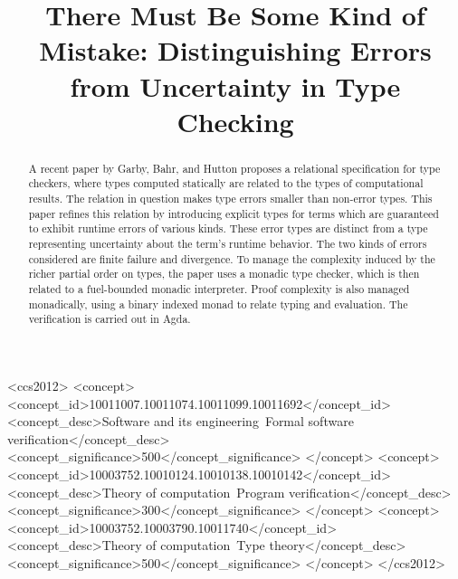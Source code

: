 \documentclass[acmsmall,screen,review]{acmart}
\begin{document}
\title{There Must Be Some Kind of Mistake: Distinguishing Errors from Uncertainty in Type Checking}




\renewcommand{\shortauthors}{\ }%

\begin{abstract}
  A recent paper by Garby, Bahr, and Hutton proposes a relational
  specification for type checkers, where types computed statically are
  related to the types of computational results.  The relation in
  question makes type errors smaller than non-error types.  This paper
  refines this relation by introducing explicit types for terms which
  are guaranteed to exhibit runtime errors of various kinds.  These
  error types are distinct from a type representing uncertainty about
  the term's runtime behavior.  The two kinds of errors considered are
  finite failure and divergence.  To manage the complexity induced by
  the richer partial order on types, the paper uses a monadic type
  checker, which is then related to a fuel-bounded monadic
  interpreter.  Proof complexity is also managed monadically, using a
  binary indexed monad to relate typing and evaluation.  The
  verification is carried out in Agda.
\end{abstract}

\begin{CCSXML}
<ccs2012>
   <concept>
       <concept_id>10011007.10011074.10011099.10011692</concept_id>
       <concept_desc>Software and its engineering~Formal software verification</concept_desc>
       <concept_significance>500</concept_significance>
       </concept>
   <concept>
       <concept_id>10003752.10010124.10010138.10010142</concept_id>
       <concept_desc>Theory of computation~Program verification</concept_desc>
       <concept_significance>300</concept_significance>
       </concept>
   <concept>
       <concept_id>10003752.10003790.10011740</concept_id>
       <concept_desc>Theory of computation~Type theory</concept_desc>
       <concept_significance>500</concept_significance>
       </concept>
 </ccs2012>
\end{CCSXML}
\end{document}
